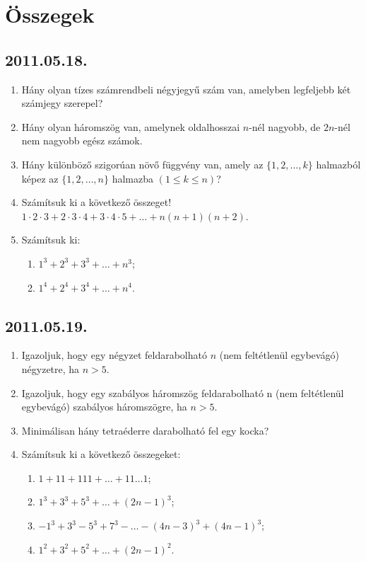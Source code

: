 \documentclass{article}
\begin{document}
\section*{Összegek}

\subsection*{2011.05.18.}
\begin{enumerate}
\item Hány olyan tízes számrendbeli négyjegyű szám van, amelyben legfeljebb két számjegy szerepel?
\item Hány olyan háromszög van, amelynek oldalhosszai $n$-nél nagyobb, de $2n$-nél nem nagyobb egész számok.
\item Hány különböző szigorúan növő függvény van, amely az $\{ 1, 2, \ldots, k\}$ halmazból képez az $\{ 1, 2, \ldots, n\}$ halmazba $(1\le k\le n)$?
\item Számítsuk ki a következő összeget! $1\cdot2\cdot3+2\cdot3\cdot4+3\cdot4\cdot5+\ldots +n(n+1)(n+2)$.
\item Számítsuk ki:
\begin{enumerate}
\item $1^3+2^3+3^3+\ldots+n^3$;
\item $1^4+2^4+3^4+\ldots+n^4$.
\end{enumerate}
\end{enumerate}

\subsection*{2011.05.19.}
\begin{enumerate}
\item Igazoljuk, hogy egy négyzet feldarabolható $n$ (nem feltétlenül egybevágó) négyzetre, ha $n>5$.
\item Igazoljuk, hogy egy szabályos háromszög feldarabolható n (nem feltétlenül egybevágó) szabályos háromszögre, ha $n>5$.
\item Minimálisan hány tetraéderre darabolható fel egy kocka?
\item Számítsuk ki a következő összegeket:
\begin{enumerate}
\item $1+11+111+\ldots+11\ldots1$;
\item $1^3+3^3+5^3+\ldots+(2n-1)^3$;
\item $-1^3+3^3-5^3+7^3-\ldots-(4n-3)^3+(4n-1)^3$;
\item $1^2+3^2+5^2+\ldots+(2n-1)^2$.
\end{enumerate}
\end{enumerate}
\end{document}
